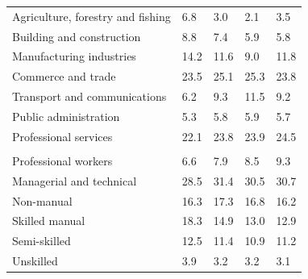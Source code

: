 \documentclass{article}
\begin{document}
\begin{table}[h]
\begin{tabular}{KTTTT}
    \hline
Agriculture, forestry and fishing  & 6.8& 3.0& 2.1& 3.5\\
Building and construction & 8.8& 7.4& 5.9& 5.8\\
Manufacturing industries & 14.2& 11.6&  9.0& 11.8\\
Commerce and trade  & 23.5& 25.1& 25.3& 23.8\\
Transport and communications  &  6.2&  9.3& 11.5&  9.2\\
Public administration & 5.3& 5.8& 5.9& 5.7\\
Professional services & 22.1& 23.8& 23.9& 24.5\\
\hline
    \\ 
    \hline
Professional workers  & 6.6& 7.9 & 8.5& 9.3\\
Managerial and technical & 28.5& 31.4& 30.5& 30.7\\
Non-manual & 16.3& 17.3& 16.8& 16.2\\
Skilled manual & 18.3& 14.9& 13.0& 12.9\\
Semi-skilled & 12.5& 11.4& 10.9& 11.2\\
Unskilled  & 3.9& 3.2& 3.2& 3.1\\
\end{tabular}
\end{table}
\pagebreak
\end{document}
